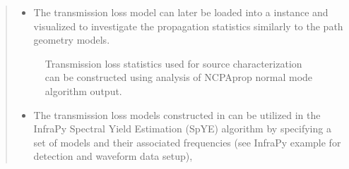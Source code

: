 \documentclass[letterpaper,10pt,english]{sphinxmanual}
\let\sphinxpxdimen\pdfpxdimen\else\newdimen\sphinxpxdimen
\begin{document}
\begin{itemize}
\begin{quote}
\begin{sphinxVerbatim}[commandchars=\\\{\}]
   
      
               
\end{sphinxVerbatim}
\begin{itemize}
\item {} 
The transmission loss model can later be loaded into a  instance and visualized to investigate the propagation statistics similarly to the path geometry models.

\end{itemize}

\begin{sphinxVerbatim}[commandchars=\\\{\}]
    
\end{sphinxVerbatim}

\begin{figure}[htbp]
\centering
\capstart

\noindent\sphinxincludegraphics[width=500\sphinxpxdimen]{{winter_0.359_tloss}.png}
\caption{Transmission loss statistics used for source characterization can be constructed using analysis of NCPAprop normal mode algorithm output.}\label{\detokenize{propagation:id4}}\end{figure}
\begin{itemize}
\item {} 
The transmission loss models constructed in  can be utilized in the InfraPy Spectral Yield Estimation (SpYE) algorithm by specifying a set of models and their associated frequencies (see InfraPy example for detection and waveform data setup),


\end{itemize}
\end{quote}
\end{itemize}
\end{document}
